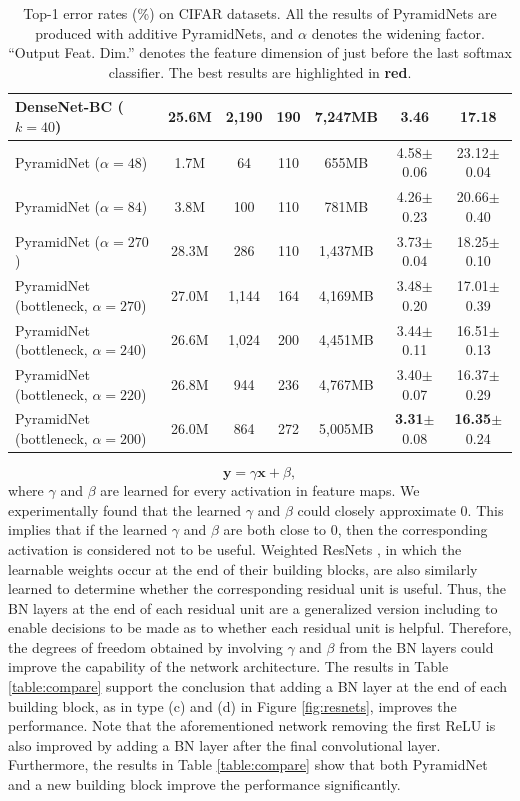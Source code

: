 \documentclass[10pt,twocolumn,letterpaper]{article}
\newcommand*{\mb}[1]{\mathbf{#1}}
\begin{document}
\begin{table}[t]
\begin{center}
\begin{tabular}{|l|c|c|c|c|c|c|}
DenseNet-BC ($k=40$)~\cite{densenet} & 25.6M & 2,190 & 190 & 7,247MB & 3.46 & 17.18 \\
\hline
PyramidNet ($\alpha=48$)             & 1.7M  & 64  & 110 & 655MB & 4.58$\pm$0.06& 23.12$\pm$0.04\\
PyramidNet ($\alpha=84$)             & 3.8M  & 100 & 110 & 781MB & 4.26$\pm$0.23 & 20.66$\pm$0.40\\
PyramidNet ($\alpha=270$)            & 28.3M & 286 & 110 & 1,437MB & {3.73}$\pm$0.04 & {18.25}$\pm$0.10\\
PyramidNet (bottleneck, $\alpha=270$)& 27.0M & 1,144 & 164 & 4,169MB & {3.48}$\pm$0.20 & {17.01}$\pm$0.39\\
PyramidNet (bottleneck, $\alpha=240$)& 26.6M & 1,024 & 200 & 4,451MB & {3.44}$\pm$0.11 & {16.51}$\pm$0.13\\
PyramidNet (bottleneck, $\alpha=220$)& 26.8M & 944 & 236 & 4,767MB & {3.40}$\pm$0.07 & {16.37}$\pm$0.29\\
PyramidNet (bottleneck, $\alpha=200$)& 26.0M & 864 & 272 & 5,005MB & {\bf \color{red} 3.31}$\pm$0.08 & {\bf \color{red} 16.35}$\pm$0.24\\
\hline
\end{tabular}
\end{center}
\caption{Top-1 error rates (\%) on CIFAR datasets. All the results of PyramidNets are produced with additive PyramidNets, and $\alpha$ denotes the widening factor. ``Output Feat. Dim.'' denotes the feature dimension of just before the last softmax classifier. The best results are highlighted in {\bf \color{red} red}.}
\label{table:result}
\end{table}
\begin{equation}
\mb{y} =\gamma \mb{x} + \beta,
\end{equation}
where $\gamma$ and $\beta$ are learned for every activation in feature maps. We experimentally found that the learned $\gamma$ and $\beta$ could closely approximate $0$. This implies that if the learned $\gamma$ and $\beta$ are both close to $0$, then the corresponding activation is considered not to be useful. Weighted ResNets \cite{weightedresnet}, in which the learnable weights occur at the end of their building blocks, are also similarly learned to determine whether the corresponding residual unit is useful. Thus, the BN layers at the end of each residual unit are a generalized version including \cite{weightedresnet} to enable decisions to be made as to whether each residual unit is helpful. Therefore, the degrees of freedom obtained by involving $\gamma$ and $\beta$ from the BN layers could improve the capability of the network architecture. The results in Table \ref{table:compare} support the conclusion that adding a BN layer at the end of each building block, as in type (c) and (d) in Figure \ref{fig:resnets}, improves the performance. Note that the aforementioned network removing the first ReLU is also improved by adding a BN layer after the final convolutional layer. Furthermore, the results in Table \ref{table:compare} show that both PyramidNet and a new building block improve the performance significantly.
\end{document}

